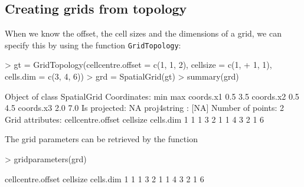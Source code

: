 \documentclass{article}
\begin{document}
\subsection{Creating grids from topology}
When we know the offset, the cell sizes and the dimensions of a grid, we
can specify this by using the function {\tt GridTopology}:
\begin{Schunk}
\begin{Sinput}
> gt = GridTopology(cellcentre.offset = c(1, 1, 2), cellsize = c(1, 
+     1, 1), cells.dim = c(3, 4, 6))
> grd = SpatialGrid(gt)
> summary(grd)
\end{Sinput}
\begin{Soutput}
Object of class SpatialGrid
Coordinates:
          min max
coords.x1 0.5 3.5
coords.x2 0.5 4.5
coords.x3 2.0 7.0
Is projected: NA 
proj4string : [NA]
Number of points: 2
Grid attributes:
  cellcentre.offset cellsize cells.dim
1                 1        1         3
2                 1        1         4
3                 2        1         6

\end{Soutput}
\end{Schunk}

The grid parameters can be retrieved by the function
\begin{Schunk}
\begin{Sinput}
> gridparameters(grd)
\end{Sinput}
\begin{Soutput}
  cellcentre.offset cellsize cells.dim
1                 1        1         3
2                 1        1         4
3                 2        1         6

\end{Soutput}
\end{Schunk}
\end{document}
